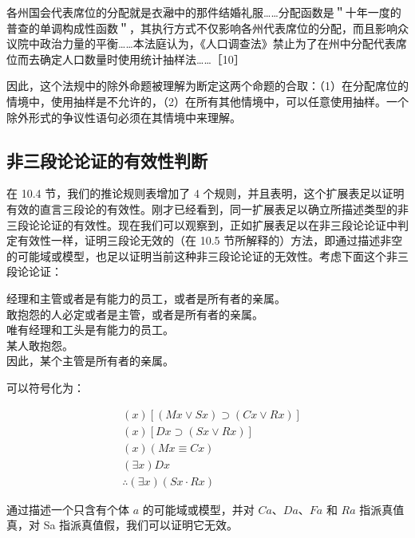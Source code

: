 各州国会代表席位的分配就是衣瀜中的那件结婚礼服……分配函数是＂十年一度的普查的单调构成性函数＂，其执行方式不仅影响各州代表席位的分配，而且影响众议院中政治力量的平衡……本法庭认为，《人口调查法》禁止为了在州中分配代表席位而去确定人口数量时使用统计抽样法……［10］

因此，这个法规中的除外命题被理解为断定这两个命题的合取：（1）在分配席位的情境中，使用抽样是不允许的，（2）在所有其他情境中，可以任意使用抽样。一个除外形式的争议性语句必须在其情境中来理解。

\subsection{非三段论论证的有效性判断}

在 10.4 节，我们的推论规则表增加了 4 个规则，并且表明，这个扩展表足以证明有效的直言三段论的有效性。刚才已经看到，同一扩展表足以确立所描述类型的非三段论论证的有效性。现在我们可以观察到，正如扩展表足以在非三段论论证中判定有效性一样，证明三段论无效的（在 10.5 节所解释的）方法，即通过描述非空的可能域或模型，也足以证明当前这种非三段论论证的无效性。考虑下面这个非三段论论证：

经理和主管或者是有能力的员工，或者是所有者的亲属。\\
敢抱怨的人必定或者是主管，或者是所有者的亲属。\\
唯有经理和工头是有能力的员工。\\
某人敢抱怨。\\
因此，某个主管是所有者的亲属。

可以符号化为：

$$
\begin{aligned}
& (x)[(M x \vee S x) \supset(C x \vee R x)] \\
& (x)[D x \supset(S x \vee R x)] \\
& (x)(M x \equiv C x) \\
& (\exists x) D x \\
& \therefore(\exists x)(S x \cdot R x)
\end{aligned}
$$

通过描述一个只含有个体 $a$ 的可能域或模型，并对 $C a 、 D a 、 F a$ 和 $R a$ 指派真值真，对 Sa 指派真值假，我们可以证明它无效。

